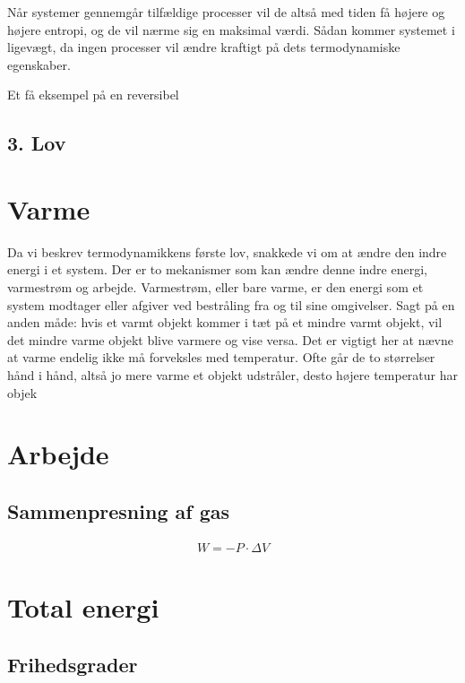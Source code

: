 \documentclass[crop=false, class=memoir]{standalone}
\begin{document}
Når systemer gennemgår tilfældige processer vil de altså med tiden få højere og højere entropi, og de vil nærme sig en maksimal værdi. Sådan kommer systemet i ligevægt, da ingen processer vil ændre kraftigt på dets termodynamiske egenskaber.

Et få  eksempel på en reversibel

\subsection{3. Lov}

\section{Varme}

Da vi beskrev termodynamikkens første lov, snakkede vi om at ændre den indre energi i et system. Der er to mekanismer som kan ændre denne indre energi, varmestrøm og arbejde. Varmestrøm, eller bare varme, er den energi som et system modtager eller afgiver ved bestråling fra og til sine omgivelser. Sagt på en anden måde: hvis et varmt objekt kommer i tæt på et mindre varmt objekt, vil det mindre varme objekt blive varmere og vise versa. Det er vigtigt her at nævne at varme endelig ikke må forveksles med temperatur. Ofte går de to størrelser hånd i hånd, altså jo mere varme et objekt udstråler, desto højere temperatur har objek

\section{Arbejde}

\subsection{Sammenpresning af gas}
\begin{align}
    W = - P \cdot \Delta V
    \label{termo:eq:quas}
\end{align}


\section{Total energi}

\subsection{Frihedsgrader}
\end{document}
